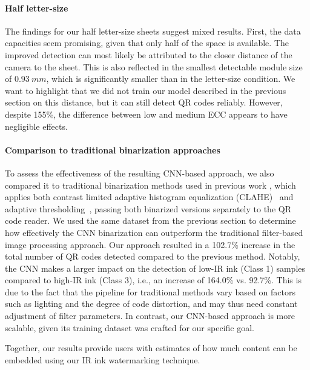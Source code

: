 \vspace{-0.1cm}

\paragraph{Half letter-size}
The findings for our half letter-size sheets suggest mixed results. First, the data capacities seem promising, given that only half of the space is available. The improved detection can most likely be attributed to the closer distance of the camera to the sheet. This is also reflected in the smallest detectable module size of $0.93~mm$, which is significantly smaller than in the letter-size condition. We want to highlight that we did not train our model described in the previous section on this distance, but it can still detect QR codes reliably. However, despite 155\%, the difference between low and medium ECC appears to have negligible effects. 


\paragraph{Comparison to traditional binarization approaches}
To assess the effectiveness of the resulting CNN-based approach, we also compared it to traditional binarization methods used in previous work \cite{dogan_standarone_2023, dogan_demonstrating_2022}, which applies both contrast limited adaptive histogram equalization (CLAHE)~\cite{zuiderveld_contrast_1994} and adaptive thresholding~\cite{sauvola_adaptive_2000}, passing both binarized versions separately to the QR code reader.
We used the same dataset from the previous section to determine how effectively the CNN binarization can outperform the traditional filter-based image processing approach.
Our approach resulted in a 102.7\% increase in the total number of  QR codes detected compared to the previous method.
Notably, the CNN makes a larger impact on the detection of low-IR ink (Class 1) samples compared to high-IR ink (Class 3), i.e., an increase of 164.0\% vs. 92.7\%.
This is due to the fact that the pipeline for traditional methods vary based on factors such as lighting and the degree of code distortion, and may thus need constant adjustment of filter parameters.
In contrast, our CNN-based approach is more scalable, given its training dataset was crafted for our specific goal. 



\vspace{0.2cm}

Together, our results provide users with estimates of how much content can be embedded using our IR ink watermarking technique. 




